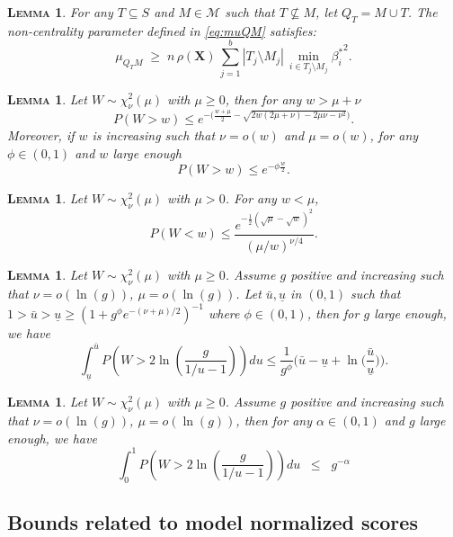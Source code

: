 \documentclass[aos]{imsart}
\theoremstyle{plain}
\newtheorem{lem}[thm]{\textsc{Lemma}}
\newcommand{\M}{\mathcal{M}}
\newcommand{\bs}{\boldsymbol}
\begin{document}
\begin{lem}\label{lem:boundrhogen}
 For any $T\subseteq S$ and $M\in\M$ such that $T\not\subseteq M$, let $Q_T=M \cup T$. The non-centrality parameter defined in \eqref{eq:muQM} satisfies: 
\begin{equation}
    \mu_{Q_TM}\; \geq \;n\,\rho(\bs X)\,\sum_{j=1}^b|T_j\setminus M_j|\,\min_{i\in T_j\setminus M_j}{\beta_{i}^*}^2.
\end{equation}
\end{lem}

\begin{lem}\label{lemma:s1s3}
Let $W\sim\chi_{\nu}^2(\mu)$ with $\mu \geq 0$, then for any $w>\mu+\nu$
$$P(W > w) \leq e^{-\big(\frac{w+\mu}{2}  - \sqrt{2w( 2 \mu+ \nu)-2 \mu \nu - \nu^2 } \big)}. $$
Moreover, if $w$ is increasing such that $\nu=o(w)$ and $\mu=o(w)$, for any $\phi\in(0,1)$ and $w$ large enough
$$P(W > w)  \leq  e^{-\phi\frac{w}{2}}.$$
\end{lem}

\begin{lem}\label{lemma:s2} Let $W \sim \chi_\nu^2(\mu)$ with $\mu>0$. For any $w<\mu$, 
$$
P(W<w) \leq \frac{e^{-\frac{1}{2}(\sqrt{\mu}-\sqrt{w})^2}}{(\mu / w)^{\nu / 4}}.$$
\end{lem}

\begin{lem}\label{lemma:s18} 
    Let $W\sim \chi_\nu^2(\mu)$ with $\mu \geq 0$. Assume $g$ positive and increasing such that $\nu=o(\ln(g))$, $\mu=o(\ln(g))$. Let $\bar{u},\underline{u}$ in $(0,1)$ such that $1>\bar{u}>\underline{u}\geq\left(1+g^{\phi}e^{-(\nu+\mu)/2}\right)^{-1}$ where $\phi\in(0,1)$, then for $g$ large enough, we have 
$$
\int_{\underline{u}}^{\bar{u}} P\left(W>2\ln \left(\frac{g}{1 / u-1}\right)\right) d u \leq  \frac{1}{g^{\phi}}\Big(\bar{u}-\underline{u}+\ln\Big(\frac{\bar{u}}{\underline{u}}\Big)\Big).
$$

\end{lem}

\begin{lem}\label{lemma:s20}
 Let $W\sim \chi_\nu^2(\mu)$ with $\mu \geq 0$. Assume $g$ positive and increasing such that $\nu=o(\ln(g))$, $\mu=o(\ln(g))$, then for any $\alpha\in(0,1)$ and $g$ large enough, we have
$$
\int_0^1 P\left(W>2 \ln \left(\frac{g}{1 / u-1}\right)\right) d u\;\; \leq\;\;  g^{-\alpha}$$
\end{lem}


\subsection{Bounds related to model normalized scores}
\end{document}
